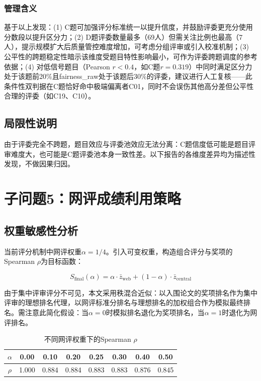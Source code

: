 \documentclass[UTF8,12pt]{ctexart}
\begin{document}
\subsubsection{管理含义}

基于以上发现：(1) C题可加强评分标准统一以提升信度，并鼓励评委更充分使用分数段以提升区分力；(2) D题评委数量最多（69人）但需关注比例也最高（7人），提示规模扩大后质量管控难度增加，可考虑分组评审或引入校准机制；(3) 公平性的跨题稳定性暗示该维度受题目特性影响最小，可作为评委跨题调度的参考依据；(4) 对低信号题目（Pearson $r < 0.4$，如C题$r=0.319$）中同时满足区分力处于该题前20\%且fairness\_raw处于该题后30\%的评委，建议进行人工复核——此条件性双判据在C题恰好命中极端偏离者C01，同时不会误伤其他高分差但公平性合理的评委（如C19、C10）。

\subsection{局限性说明}

由于评委完全不跨题，题目效应与评委池效应无法分离：C题信度低可能是题目评审难度大，也可能是C题评委池本身一致性差。以下报告的各维度差异均为描述性发现，不做因果归因。

\section{子问题5：网评成绩利用策略}

\subsection{权重敏感性分析}

当前评分机制中网评权重$\alpha = 1/4$。引入可变权重，构造组合评分与奖项的Spearman $\rho$为目标函数：

\begin{equation}
S_{\text{final}}(\alpha) = \alpha \cdot \bar{z}_{\text{web}} + (1-\alpha) \cdot \bar{z}_{\text{central}}
\end{equation}

由于集中评审评分不可见，本文采用秩混合近似：以入围论文的奖项排名作为集中评审的理想排名代理，以网评标准分排名与理想排名的加权组合作为模拟最终排名。需注意此简化假设：当$\alpha=0$时模拟排名退化为奖项排名，当$\alpha=1$时退化为网评排名。

\begin{table}[H]
\centering
\caption{不同网评权重下的Spearman $\rho$}
\begin{tabular}{cccccccc}
\toprule
$\alpha$ & 0.00 & 0.10 & 0.20 & 0.25 & 0.30 & 0.40 & 0.50 \\
\midrule
$\rho$ & 1.000 & 0.884 & 0.884 & 0.883 & 0.883 & 0.876 & 0.845 \\
\bottomrule
\end{tabular}
\end{table}
\end{document}
